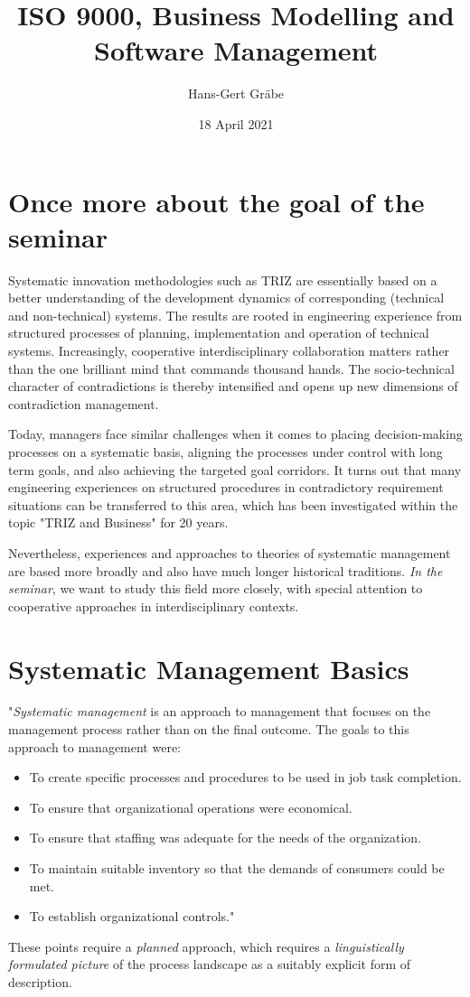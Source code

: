 \documentclass[11pt,a4paper]{article}
\title{ISO 9000, Business Modelling and Software Management}
\author{Hans-Gert Gr\"abe}
\date{18 April 2021}
\begin{document}
\maketitle

\section{Once more about the goal of the seminar}

Systematic innovation methodologies such as TRIZ are essentially based on a
better understanding of the development dynamics of corresponding (technical
and non-technical) systems.  The results are rooted in engineering experience
from structured processes of planning, implementation and operation of
technical systems. Increasingly, cooperative interdisciplinary collaboration
matters rather than the one brilliant mind that commands thousand hands. The
socio-technical character of contradictions is thereby intensified and opens
up new dimensions of contradiction management.

Today, managers face similar challenges when it comes to placing
decision-making processes on a systematic basis, aligning the processes under
control with long term goals, and also achieving the targeted goal corridors.
It turns out that many engineering experiences on structured procedures in
contradictory requirement situations can be transferred to this area, which
has been investigated within the topic "TRIZ and Business" for 20 years.

Nevertheless, experiences and approaches to theories of systematic management
are based more broadly and also have much longer historical traditions.
\emph{In the seminar}, we want to study this field more closely, with special
attention to cooperative approaches in interdisciplinary contexts.

\section{Systematic Management Basics}

"\emph{Systematic management} is an approach to management that focuses on the
management process rather than on the final outcome. The goals to this
approach to management were:
\begin{itemize}[noitemsep]
\item To create specific processes and procedures to be used in job task
  completion.
\item To ensure that organizational operations were economical.
\item To ensure that staffing was adequate for the needs of the organization.
\item To maintain suitable inventory so that the demands of consumers could be
  met.
\item To establish organizational controls." \cite{Hill2015}
\end{itemize}
These points require a \emph{planned} approach, which requires a
\emph{linguistically formulated picture} of the process landscape as a
suitably explicit form of description.
\end{document}
